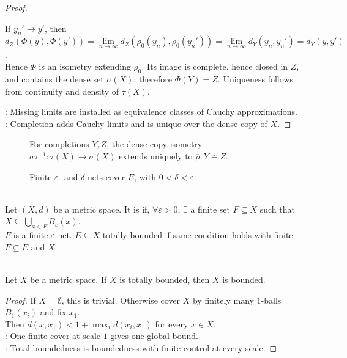 \begin{theorem}
\begin{proof}
\begin{enumerate}[label=\roman*.]
If $y_n'\to y'$, then $d_Z(\Phi(y),\Phi(y'))=\lim\limits_{n\to\infty} d_Z(\rho_0(y_n),\rho_0(y_n'))=\lim\limits_{n\to\infty} d_Y(y_n,y_n')=d_Y(y,y')$.\\
Hence $\Phi$ is an isometry extending $\rho_0$. Its image is complete, hence closed in $Z$, and contains the dense set $\sigma(X)$; therefore $\Phi(Y)=Z$. Uniqueness follows from continuity and density of $\tau(X)$.
\end{enumerate}
: Missing limits are installed as equivalence classes of Cauchy approximations.\\
: Completion adds Cauchy limits and is unique over the dense copy of $X$.
\end{proof}
\end{theorem}

\begin{figure}[H]
  \centering
  
  \caption{For completions $Y,Z$, the dense-copy isometry
  $\sigma\tau^{-1}:\tau(X)\to\sigma(X)$ extends uniquely to
  $\overline{\rho}:Y\cong Z$.}
  \label{fig:metric-completion-uniqueness}
\end{figure}


\begin{figure}[H]
  \centering
  
  \caption{Finite $\varepsilon$- and $\delta$-nets cover $E$, with $0<\delta<\varepsilon$.}
  \label{fig:total-boundedness-finite-cover}
\end{figure}

\begin{definition} \label{def:totally-bounded-metric-space} \\
Let $(X,d)$ be a metric space. It is  if, $\forall \varepsilon>0$, $\exists$ a finite set $F\subseteq X$ such that $X\subseteq\bigcup\limits_{x\in F}B_\varepsilon(x)$.\\
$F$ is a finite $\varepsilon$-net. $E\subseteq X$ totally bounded if same condition holds with finite $F\subseteq E$ and $X$.
\end{definition}

\begin{theorem} \label{thm:total-bounded-implies-bounded} \\
Let $X$ be a metric space.
If $X$ is totally bounded, then $X$ is bounded.
\begin{proof}
If $X=\emptyset$, this is trivial. Otherwise cover $X$ by finitely many $1$-balls $B_1(x_i)$ and fix $x_1$.\\
Then $d(x,x_1)<1+\max_i d(x_i,x_1)$ for every $x\in X$.\\
: One finite cover at scale $1$ gives one global bound.\\
: Total boundedness is boundedness with finite control at every scale.
\end{proof}
\end{theorem}

